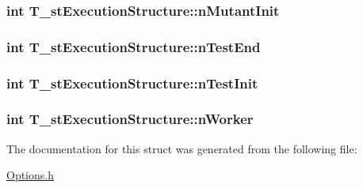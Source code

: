 \hypertarget{structT__stExecutionStructure_aba815b781854b96b556e84b8bb358416}{
\subsubsection[{n\-Mutant\-Init}]{\setlength{\rightskip}{0pt plus 5cm}int T\-\_\-st\-Execution\-Structure\-::n\-Mutant\-Init}}\label{structT__stExecutionStructure_aba815b781854b96b556e84b8bb358416}
\hypertarget{structT__stExecutionStructure_a36d89b987dd32ba06e929a5c4864c669}{
\subsubsection[{n\-Test\-End}]{\setlength{\rightskip}{0pt plus 5cm}int T\-\_\-st\-Execution\-Structure\-::n\-Test\-End}}\label{structT__stExecutionStructure_a36d89b987dd32ba06e929a5c4864c669}
\hypertarget{structT__stExecutionStructure_adf3335889b33fa5d5137b5f0b1d2dce2}{
\subsubsection[{n\-Test\-Init}]{\setlength{\rightskip}{0pt plus 5cm}int T\-\_\-st\-Execution\-Structure\-::n\-Test\-Init}}\label{structT__stExecutionStructure_adf3335889b33fa5d5137b5f0b1d2dce2}
\hypertarget{structT__stExecutionStructure_aba070c3809e1154cba64086680fd19d9}{
\subsubsection[{n\-Worker}]{\setlength{\rightskip}{0pt plus 5cm}int T\-\_\-st\-Execution\-Structure\-::n\-Worker}}\label{structT__stExecutionStructure_aba070c3809e1154cba64086680fd19d9}


The documentation for this struct was generated from the following file\-:\begin{DoxyCompactItemize}
\item 
\hyperlink{Options_8h}{Options.\-h}\end{DoxyCompactItemize}
